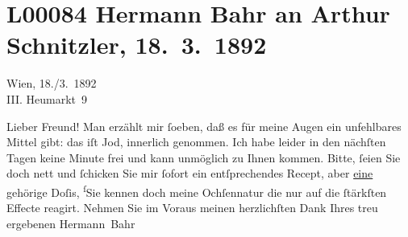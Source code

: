 

\section[Hermann Bahr an Arthur Schnitzler, 18. 3. 1892]{L00084 Hermann Bahr an Arthur Schnitzler, 18. 3. 1892}
\nopagebreak{}
\rehead{ }\normalsize\beginnumbering{}
\toendnotes[C]{\smallbreak\pagebreak[2]}
\pstart
           \raggedleft{}{\pb}Wien, 18./3. 1892{\\}III. Heumarkt 9\pend
           
\pstart{}Lieber Freund!\pend\vspace{0.5em}
\pstart
           Man erzählt mir ſoeben, daß es für meine Augen ein unfehlbares Mittel gibt: das iſt
               Jod, innerlich genommen. Ich habe leider in den nächſten Tagen keine Minute frei und
               kann unmöglich zu Ihnen kommen. Bitte, ſeien Sie doch nett und ſchicken Sie mir
               ſofort ein entſprechendes Recept, aber \uline{eine}{ }{\pb}gehörige Doſis, \substVorne{}\textsuperscript{ſ}\substDazwischen{}S\substHinten{}ie kennen doch meine \label{LL153-1v}Ochſennatur\label{LL153-1h} die nur auf die ſtärkſten Effecte reagirt. Nehmen Sie im
               Voraus meinen herzlichſten Dank Ihres treu ergebenen\pend
           \pstart \spacefill\mbox{Hermann Bahr}\pend{}\endnumbering{}  
      